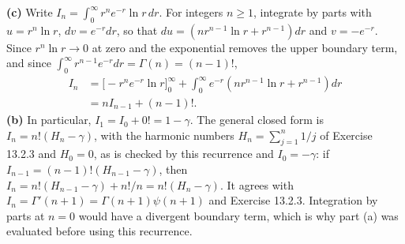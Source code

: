 \textbf{(c)} Write $I_n=\int_0^\infty r^ne^{-r}\ln r\,dr$.
For integers $n\ge1$, integrate by parts with
$u=r^n\ln r$, $dv=e^{-r}dr$, so that
$du=(nr^{n-1}\ln r+r^{n-1})dr$ and $v=-e^{-r}$.  Since
$r^n\ln r\to0$ at zero and the exponential removes the upper
boundary term, and since $\int_0^\infty r^{n-1}e^{-r}dr=\Gamma(n)
=(n-1)!$,
\begin{align*}
I_n&=\bigl[-r^ne^{-r}\ln r\bigr]_0^\infty
+\int_0^\infty e^{-r}(nr^{n-1}\ln r+r^{n-1})dr\\
&=\boxed{nI_{n-1}+(n-1)!}.
\end{align*}
\textbf{(b)} In particular, $I_1=I_0+0!=\boxed{1-\gamma}$.
The general closed form is $I_n=n!(H_n-\gamma)$, with the harmonic
numbers $H_n=\sum_{j=1}^n1/j$ of Exercise 13.2.3 and $H_0=0$, as is
checked by this recurrence and $I_0=-\gamma$: if
$I_{n-1}=(n-1)!(H_{n-1}-\gamma)$, then
$I_n=n!(H_{n-1}-\gamma)+n!/n=n!(H_n-\gamma)$.  It agrees with
$I_n=\Gamma'(n+1)=\Gamma(n+1)\psi(n+1)$ and Exercise 13.2.3.
Integration by parts at $n=0$ would have a divergent boundary term,
which is why part (a) was evaluated before using this recurrence.


